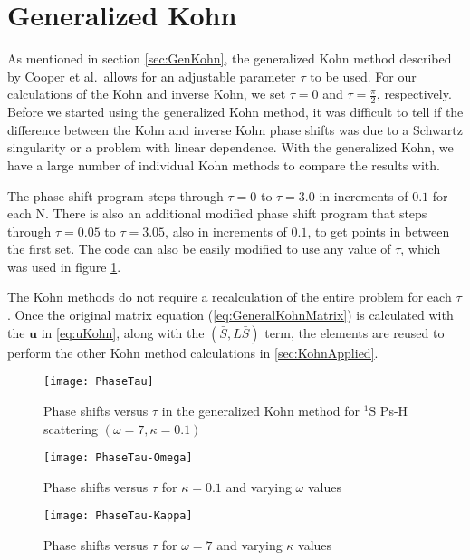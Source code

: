 \documentclass[Dissertation.tex]{subfiles}
\begin{document}
\section{Generalized Kohn}
\label{sec:CompGenKohn}
As mentioned in section \ref{sec:GenKohn}, the generalized Kohn method described by Cooper et al.\ allows for an adjustable parameter $\tau$ to be used. For our calculations of the Kohn and inverse Kohn, we set $\tau = 0$ and $\tau = \frac{\pi}{2}$, respectively. Before we started using the generalized Kohn method, it was difficult to tell if the difference between the Kohn and inverse Kohn phase shifts was due to a Schwartz singularity or a problem with linear dependence. With the generalized Kohn, we have a large number of individual Kohn methods to compare the results with.

The phase shift program steps through $\tau = 0$ to $\tau = 3.0$ in increments of $0.1$ for each N. There is also an additional modified phase shift program that steps through $\tau = 0.05$ to $\tau = 3.05$, also in increments of $0.1$, to get points in between the first set. The code can also be easily modified to use any value of $\tau$, which was used in figure \ref{fig:PhaseTau}.

The Kohn methods do not require a recalculation of the entire problem for each $\tau$. Once the original matrix equation (\cref{eq:GeneralKohnMatrix}) is calculated with the $\textbf{u}$ in \cref{eq:uKohn}, along with the $(\bar{S},L\bar{S})$ term, the elements are reused to perform the other Kohn method calculations in \cref{sec:KohnApplied}.



\setlength{\abovecaptionskip}{0pt}   %

\begin{figure}[H]
	\centering
	\texttt{[image: PhaseTau]}
	\caption[Phase shifts versus $\tau$ in the generalized Kohn method]{Phase shifts versus $\tau$ in the generalized Kohn method for $^1$S Ps-H scattering $(\omega = 7, \kappa = 0.1)$}
	\label{fig:PhaseTau}
\end{figure}

\begin{figure}[H]
	\centering
	\texttt{[image: PhaseTau-Omega]}
	\caption{Phase shifts versus $\tau$ for $\kappa = 0.1$ and varying $\omega$ values}
	\label{fig:PhaseTau-Omega}
\end{figure}

\begin{figure}[H]
	\centering
	\texttt{[image: PhaseTau-Kappa]}
	\caption{Phase shifts versus $\tau$ for $\omega = 7$ and varying $\kappa$ values}
	\label{fig:PhaseTau-Kappa}
\end{figure}
\end{document}
